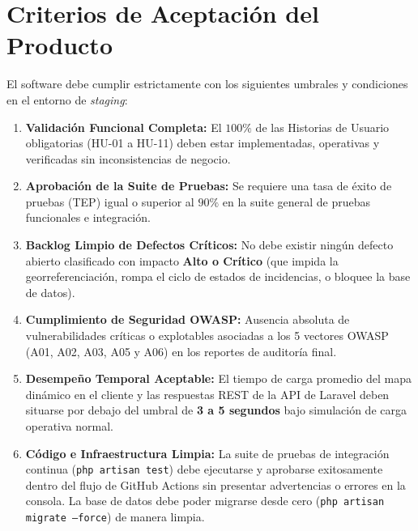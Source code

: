 \section{Criterios de Aceptación del Producto}

El software debe cumplir estrictamente con los siguientes umbrales y condiciones en el entorno de \textit{staging}:

\begin{enumerate}
    \item \textbf{Validación Funcional Completa:} El $100\%$ de las Historias de Usuario obligatorias (HU-01 a HU-11) deben estar implementadas, operativas y verificadas sin inconsistencias de negocio.
    \item \textbf{Aprobación de la Suite de Pruebas:} Se requiere una tasa de éxito de pruebas (TEP) igual o superior al $90\%$ en la suite general de pruebas funcionales e integración.
    \item \textbf{Backlog Limpio de Defectos Críticos:} No debe existir ningún defecto abierto clasificado con impacto \textbf{Alto o Crítico} (que impida la georreferenciación, rompa el ciclo de estados de incidencias, o bloquee la base de datos).
    \item \textbf{Cumplimiento de Seguridad OWASP:} Ausencia absoluta de vulnerabilidades críticas o explotables asociadas a los 5 vectores OWASP (A01, A02, A03, A05 y A06) en los reportes de auditoría final.
    \item \textbf{Desempeño Temporal Aceptable:} El tiempo de carga promedio del mapa dinámico en el cliente y las respuestas REST de la API de Laravel deben situarse por debajo del umbral de \textbf{3 a 5 segundos} bajo simulación de carga operativa normal.
    \item \textbf{Código e Infraestructura Limpia:} La suite de pruebas de integración continua (\texttt{php artisan test}) debe ejecutarse y aprobarse exitosamente dentro del flujo de GitHub Actions sin presentar advertencias o errores en la consola. La base de datos debe poder migrarse desde cero (\texttt{php artisan migrate --force}) de manera limpia.
\end{enumerate}